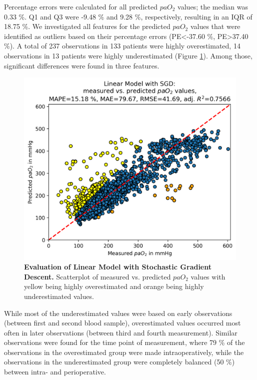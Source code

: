 \documentclass[referee,lineno,pdflatex,sn-nature]{sn-jnl}%
\theoremstyle{thmstyleone}%
\theoremstyle{thmstyletwo}%
\theoremstyle{thmstylethree}%
\begin{document}
Percentage errors were calculated for all predicted $paO_2$ values; the median was 0.33 \%. Q1 and Q3 were -9.48 \% and 9.28 \%, respectively, resulting in an IQR of 18.75 \%. We investigated all features for the predicted $paO_2$ values that were identified as outliers based on their percentage errors (PE\textless-37.60 \%, PE\textgreater37.40 \%). A total of 237 observations in 133 patients were highly overestimated, 14 observations in 13 patients were highly underestimated (Figure \ref{fig7}). Among those, significant differences were found in three features. 

\begin{figure}[h]
    \centering
    \includegraphics[width=1\linewidth]{images/Figure7.png}
    \caption{\textbf{Evaluation of Linear Model with Stochastic Gradient Descent.} Scatterplot of measured vs. predicted $paO_2$ values with yellow being highly overestimated and orange being highly underestimated values.}
    \label{fig7}
\end{figure}

While most of the underestimated values were based on early observations (between first and second blood sample), overestimated values occurred most often in later observations (between third and fourth measurement). Similar observations were found for the time point of measurement, where 79 \% of the observations in the overestimated group were made intraoperatively, while the observations in the underestimated group were completely balanced (50 \%) between intra- and perioperative. 
\end{document}
